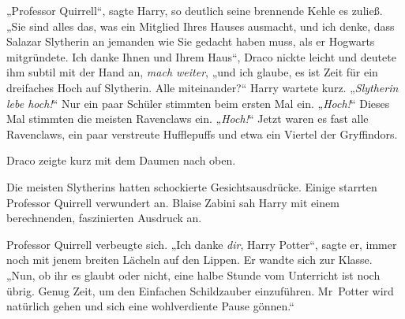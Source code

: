 „Professor Quirrell“, sagte Harry, so deutlich seine brennende Kehle es zuließ.
„Sie sind alles das, was ein Mitglied Ihres Hauses ausmacht, und ich denke, dass Salazar Slytherin an jemanden wie Sie gedacht haben muss, als er Hogwarts mitgründete. Ich danke Ihnen und Ihrem Haus“, Draco nickte leicht und deutete ihm subtil mit der Hand an, \emph{mach weiter}, „und ich glaube, es ist Zeit für ein dreifaches Hoch auf Slytherin. Alle miteinander?“ Harry wartete kurz.
„\emph{Slytherin lebe hoch!}“ Nur ein paar Schüler stimmten beim ersten Mal ein.
„\emph{Hoch!}“ Dieses Mal stimmten die meisten Ravenclaws ein.
„\emph{Hoch!}“ Jetzt waren es fast alle Ravenclaws, ein paar verstreute Hufflepuffs und etwa ein Viertel der Gryffindors.

Draco zeigte kurz mit dem Daumen nach oben.

Die meisten Slytherins hatten schockierte Gesichtsausdrücke. Einige starrten Professor Quirrell verwundert an. Blaise Zabini sah Harry mit einem berechnenden, faszinierten Ausdruck an.

Professor Quirrell verbeugte sich.
„Ich danke \emph{dir}, Harry Potter“, sagte er, immer noch mit jenem breiten Lächeln auf den Lippen. Er wandte sich zur Klasse.
„Nun, ob ihr es glaubt oder nicht, eine halbe Stunde vom Unterricht ist noch übrig. Genug Zeit, um den Einfachen Schildzauber einzuführen. Mr~Potter wird natürlich gehen und sich eine wohlverdiente Pause gönnen.“

